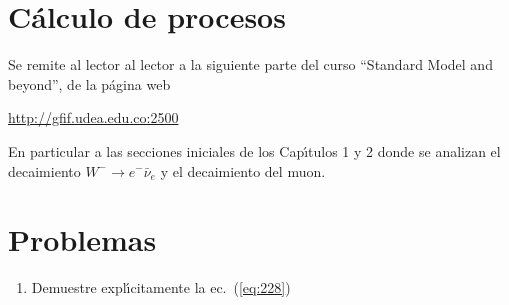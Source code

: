 \section{C\'alculo de procesos}
\label{sec:calculo-de-procesos}
Se remite al lector al lector a la siguiente parte del curso ``Standard Model and beyond'', de la p\'agina web 

\url{http://gfif.udea.edu.co:2500}

En particular a las secciones iniciales de los Cap\'\i tulos 1 y 2 donde se analizan el decaimiento $W^-\to e^-\bar{\nu}_e$ y el decaimiento del muon. 


\section{Problemas}
\label{sec:problemas-1}
\begin{enumerate}
\item Demuestre expl\'\i citamente la ec.~(\ref{eq:228})
\label{item:chap6.1}
\end{enumerate}


%

